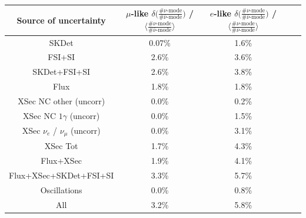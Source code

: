 \begin{table}
\center
\begin{tabular}{| c || c | c || c | c |}
\hline
Source of uncertainty 
&$\mu$-like ${\delta} \Big( \frac{\# {\nu} \text{-mode}}{\# {\bar{\nu}} \text{-mode} } \Big) $ / $\Big \langle \frac{\# {\nu} \text{-mode}}{\# {\bar{\nu}} \text{-mode} } \Big \rangle$ 
&$e$-like ${\delta} \Big( \frac{\# {\nu} \text{-mode}}{\# {\bar{\nu}} \text{-mode} } \Big) $ / $\Big \langle \frac{\# {\nu} \text{-mode}}{\# {\bar{\nu}} \text{-mode} } \Big \rangle$ \\


\hline
\hline
SKDet & 0.07\% & 1.6\% \\ \hline
FSI+SI & 2.6\% & 3.6\% \\ \hline
SKDet+FSI+SI & 2.6\% & 3.8\% \\ \hline
\hline
Flux & 1.8\% & 1.8\% \\ \hline
XSec NC other (uncorr) & 0.0\% & 0.2\% \\ \hline
XSec NC $1\gamma$ (uncorr) & 0.0\% & 1.5\% \\ \hline
XSec $\nu_e$ / $\nu_{\mu}$ (uncorr) & 0.0\% & 3.1\% \\ \hline
XSec Tot & 1.7\% & 4.3\% \\ \hline
 \hline
Flux+XSec & 1.9\% & 4.1\% \\ \hline
 \hline
Flux+XSec+SKDet+FSI+SI & 3.3\% & 5.7\% \\ \hline
 \hline
Oscillations & 0.0\% & 0.8\% \\ \hline
 \hline
All & 3.2\% & 5.8\% \\ \hline



\end{tabular}
\end{table}
